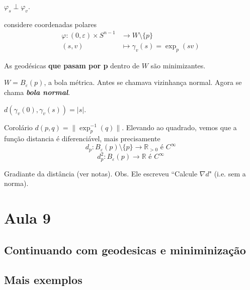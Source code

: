 \begin{coro}\leavevmode
\(\varphi_s \perp \varphi_v\).
\end{coro}

\begin{coro}\leavevmode
considere coordenadas polares
\begin{align*}
	\varphi: (0,\varepsilon)\times S^{n-1} &\longrightarrow W\setminus \{p\} \\
	(s,v) &\longmapsto \gamma_v(s)=\operatorname{exp}_p(sv)
\end{align*}

	As geodésicas \textbf{que pasam por p} dentro de \(W\) são minimizantes.
\end{coro}

\begin{coro}\leavevmode
\(W=B_\varepsilon(p)\), a bola métrica. Antes se chamava vizinhança normal. Agora se chama \textit{\textbf{bola normal}}.
\end{coro}

\begin{coro}\leavevmode
\(d(\gamma_v(0),\gamma_v(s))=|s|\).
\end{coro}

\begin{thing8}{Corolário}\leavevmode
\(d(p,q)=\|\operatorname{exp}^{-1}_p(q)\|\). Elevando ao quadrado, vemos que a função distancia é diferenciável, mais precisamente
\[d_p:B_\varepsilon(p)\setminus \{p\}\longrightarrow \mathbb{R}_{>0}\text{ é \(C^\infty\)} \]
\[d^2_p:B_\varepsilon(p) \longrightarrow \mathbb{R} \text{ é \(C^\infty\)} \]
\end{thing8}

\begin{exercise}\leavevmode
Gradiante da distância (ver notas). Obs. Ele escreveu ``Calcule \(\nabla d\)" (i.e. sem a norma).\end{exercise}

\section{Aula 9}

\subsection{Continuando com geodesicas e miniminização}

\subsection{Mais exemplos}

